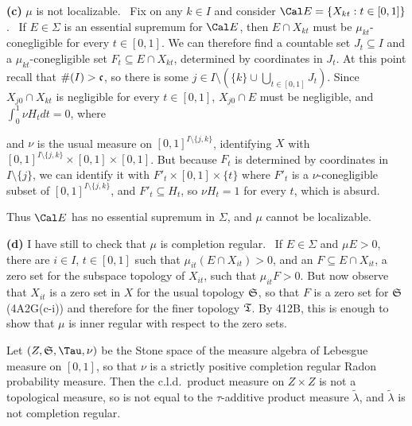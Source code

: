 {\medskip

{\bf (c)} $\mu$ is not localizable.   \Prf\ Fix on any $k\in I$ and
consider $\Cal E=\{X_{kt}:t\in[0,1]\}$.   \Quer\ If $E\in\Sigma$ is an
essential supremum for $\Cal E$, then $E\cap X_{kt}$ must be
$\mu_{kt}$-conegligible for every $t\in [0,1]$.   We can therefore find
a countable set $J_t\subseteq I$ and a $\mu_{kt}$-conegligible set
$F_t\subseteq E\cap X_{kt}$, determined by coordinates in $J_t$.   At
this point recall that $\#(I)>\frak c$, so there is some $j\in
I\setminus(\{k\}\cup\bigcup_{t\in[0,1]}J_t)$.   Since $X_{j0}\cap
X_{kt}$ is negligible for every $t\in[0,1]$, $X_{j0}\cap E$ must be
negligible, and $\int_0^1\nu H_tdt=0$, where

\noindent and $\nu$ is the usual measure on $[0,1]^{I\setminus\{j,k\}}$,
identifying $X$ with $[0,1]^{I\setminus\{j,k\}}\times[0,1]\times[0,1]$.
But because $F_t$ is determined by coordinates in $I\setminus\{j\}$, we
can identify it with $F'_t\times[0,1]\times\{t\}$ where $F'_t$ is a
$\nu$-conegligible subset of $[0,1]^{I\setminus\{j,k\}}$, and
$F'_t\subseteq H_t$, so $\nu H_t=1$ for every $t$, which is absurd.\
\Bang

Thus $\Cal E$ has no essential supremum in $\Sigma$, and $\mu$ cannot be
localizable.\ \Qed

\medskip

{\bf (d)} I have still to check that $\mu$ is completion regular.
\Prf\ If $E\in\Sigma$ and $\mu E>0$, there are $i\in I$, $t\in[0,1]$
such that $\mu_{it}(E\cap X_{it})>0$, and an $F\subseteq E\cap X_{it}$,
a zero set for the subspace topology of $X_{it}$, such that
$\mu_{it}F>0$.   But now
observe that $X_{it}$ is a zero set in $X$ for the usual topology
$\frak S$, so that $F$ is a zero set for $\frak S$ (4A2G(c-i))
and therefore
for the finer topology $\frak T$.   By 412B, this is enough to show that
$\mu$ is inner regular with respect to the zero sets.\ \Qed
}%


 Let
$(Z,\frak S,\Tau,\nu)$ be the Stone space of the
measure algebra of Lebesgue measure on $[0,1]$, so that $\nu$ is a
strictly positive completion regular Radon probability
measure.   Then the c.l.d.\ product
measure\cmmnt{ $\lambda$} on $Z\times Z$ is not a topological measure,
so is not equal to the $\tau$-additive product measure $\tilde\lambda$,
and $\tilde\lambda$ is not completion regular.


